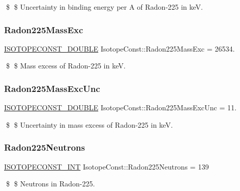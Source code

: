 \$ \$ Uncertainty in binding energy per A of Radon-\/225 in keV. \mbox{\label{group___isotope_const-_radon-_rn225_ga958b306cb0689799dbdaea12e158d012}} 
\subsubsection{\texorpdfstring{Radon225\+Mass\+Exc}{Radon225MassExc}}
{\footnotesize\ttfamily \mbox{\hyperlink{group___isotope_const-_macros_ga8f45a7272ce02c0b4c65c44636ed719a}{I\+S\+O\+T\+O\+P\+E\+C\+O\+N\+S\+T\+\_\+\+D\+O\+U\+B\+LE}} Isotope\+Const\+::\+Radon225\+Mass\+Exc = 26534.}

\$ \$ Mass excess of Radon-\/225 in keV. \mbox{\label{group___isotope_const-_radon-_rn225_gac8e35c8af6606f28c7a2948f343224bc}} 
\subsubsection{\texorpdfstring{Radon225\+Mass\+Exc\+Unc}{Radon225MassExcUnc}}
{\footnotesize\ttfamily \mbox{\hyperlink{group___isotope_const-_macros_ga8f45a7272ce02c0b4c65c44636ed719a}{I\+S\+O\+T\+O\+P\+E\+C\+O\+N\+S\+T\+\_\+\+D\+O\+U\+B\+LE}} Isotope\+Const\+::\+Radon225\+Mass\+Exc\+Unc = 11.}

\$ \$ Uncertainty in mass excess of Radon-\/225 in keV. \mbox{\label{group___isotope_const-_radon-_rn225_ga66e54f92500e77add02a679084bf9676}} 
\subsubsection{\texorpdfstring{Radon225\+Neutrons}{Radon225Neutrons}}
{\footnotesize\ttfamily \mbox{\hyperlink{group___isotope_const-_macros_ga5f18360b3e99483a35c32d789e62621c}{I\+S\+O\+T\+O\+P\+E\+C\+O\+N\+S\+T\+\_\+\+I\+NT}} Isotope\+Const\+::\+Radon225\+Neutrons = 139}

\$ \$ Neutrons in Radon-\/225. \mbox{\label{group___isotope_const-_radon-_rn225_gae4da9d4892622ef3bee1c9f5fcb2ea32}} 
